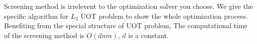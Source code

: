 Screening method is irrelevent to the optimization solver you choose. We give the specific algorithm for $L_2$ UOT problem to show the whole optimization process.\\
Benefiting from the special structure of UOT problem, The computational time of the screening method is $O(dnm)$, $d$ is a constant.











































